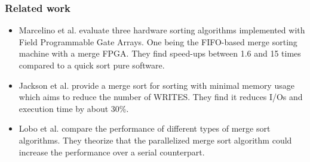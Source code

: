 \begin{frame}[hoved]
	\frametitle{Related work}
	\begin{itemize}
		\item Marcelino et al. evaluate three hardware sorting algorithms
		      implemented with Field Programmable Gate Arrays. One being the FIFO-based
		      merge sorting machine with a merge FPGA. They find speed-ups between 1.6
		      and 15 times compared to a quick sort pure software.

		\item Jackson et al. provide a merge sort for sorting with minimal memory
		      usage which aims to reduce the number of WRITES. They find it reduces I/Os
		      and execution time by about 30\%.

		\item Lobo et al. compare the performance of different types of merge sort
		      algorithms. They theorize that the parallelized merge sort algorithm could
		      increase the performance over a serial counterpart.
	\end{itemize}
\end{frame}

